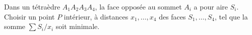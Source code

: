 Dans un tétraèdre $A_1A_2A_3A_4$, la face opposée au sommet $A_i$ a pour aire $S_i$. Choisir un point $P$ intérieur, à distances $x_1, \ldots, x_4$ des faces $S_1, \ldots, S_4$, tel que la somme $\sum S_i/x_i$ soit minimale.
